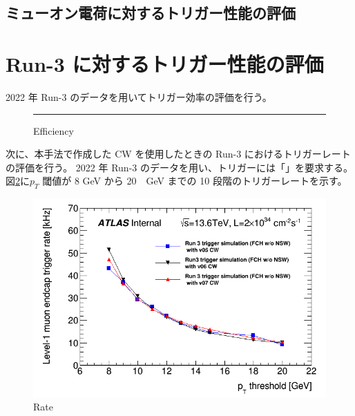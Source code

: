\subsection{ミューオン電荷に対するトリガー性能の評価}

\section{Run-3 に対するトリガー性能の評価}
2022 年 Run-3 のデータを用いてトリガー効率の評価を行う。
\begin{figure}[tb]
  \centering
  \rule{8cm}{6cm}
  \caption{Efficiency}
  \label{fig:fit_def}
\end{figure}

次に、本手法で作成した CW を使用したときの Run-3 におけるトリガーレートの評価を行う。
2022 年 Run-3 のデータを用い、トリガーには「」を要求する。
図\ref{fig:Run-3_rate}に$p_T$ 閾値が 8 GeV から 20　GeV までの 10 段階のトリガーレートを示す。
\begin{figure}[tb]
  \centering
  \includegraphics[clip, width=14cm]{fig/5/l1mue_rate_run3.png}
  \caption{Rate}
  \label{fig:Run-3_rate}
\end{figure}



